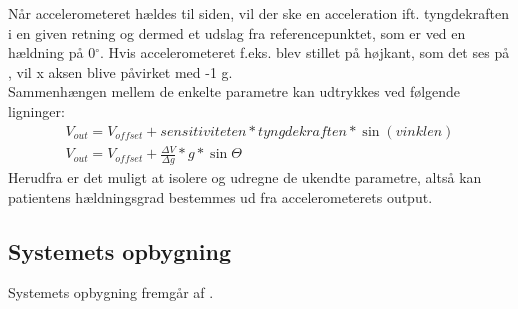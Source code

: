 Når accelerometeret hældes til siden, vil der ske en acceleration ift. tyngdekraften i en given retning og dermed et udslag fra referencepunktet, som er ved en hældning på 0$^{\circ}$. Hvis accelerometeret f.eks. blev stillet på højkant, som det ses på , vil x aksen blive påvirket med -1 g.\cite{Devices2009} \\
Sammenhængen mellem de enkelte parametre kan udtrykkes ved følgende ligninger:\\ 
\begin{align}
	V_{out} = V_{offset} + sensitiviteten * tyngdekraften * \sin(vinklen) \\
	V_{out} = V_{offset} + \frac{\Delta V}{\Delta g} * g * \sin \Theta
\end{align}
Herudfra er det muligt at isolere og udregne de ukendte parametre, altså kan patientens hældningsgrad bestemmes ud fra accelerometerets output.

\subsection{Systemets opbygning} 
Systemets opbygning fremgår af .

